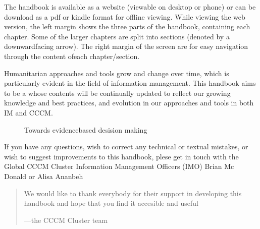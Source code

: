 \documentclass[letterpaper,10pt,english]{jupyterBook}
\let\sphinxpxdimen\pdfpxdimen\else\newdimen\sphinxpxdimen
\begin{document}
\sphinxAtStartPar
The handbook is available as a website (viewable on desktop or phone) or can be download as a pdf or kindle format for offline viewing. While viewing the web version, the left margin shows the three parts of the handbook, containing each chapter. Some of the larger chapters are split into sections (denoted by a downward\sphinxhyphen{}facing arrow). The right margin of the screen are for easy navigation through the content ofeach chapter/section.

\sphinxAtStartPar
Humanitarian approaches and tools grow and change over time, which is particularly evident in the field of information management. This handbook aims to be a  whose contents will be continually updated to reflect our growing knowledge and best practices, and evolution in our approaches and tools in both IM and CCCM.

\begin{figure}[htbp]
\centering
\capstart

\noindent\sphinxincludegraphics[width=400\sphinxpxdimen]{{spirits}.jpg}
\caption{Towards evidence\sphinxhyphen{}based desision making}\label{\detokenize{intro:id2}}\end{figure}

\begin{DUlineblock}{0em}
\item[] 
\end{DUlineblock}

\sphinxAtStartPar
If you have any questions, wish to correct any technical or textual mistakes, or wish to suggest improvements to this handbook, plese get in touch with the Global CCCM Cluster Information Management Officers (IMO) Brian Mc Donald \sphinxhyphen{}  or Alisa Ananbeh \sphinxhyphen{} 
\begin{quote}

\sphinxAtStartPar
We would like to thank everybody for their support in developing this handbook and hope that you find it accesible and useful

\begin{flushright}
---the CCCM Cluster team
\end{flushright}
\end{quote}

\begin{DUlineblock}{0em}
\item[] 
\end{DUlineblock}
\end{document}

